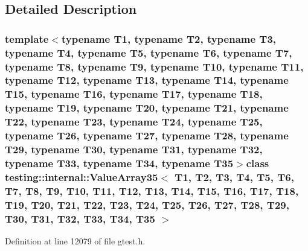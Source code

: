 \subsection{\-Detailed \-Description}
\subsubsection*{template$<$typename T1, typename T2, typename T3, typename T4, typename T5, typename T6, typename T7, typename T8, typename T9, typename T10, typename T11, typename T12, typename T13, typename T14, typename T15, typename T16, typename T17, typename T18, typename T19, typename T20, typename T21, typename T22, typename T23, typename T24, typename T25, typename T26, typename T27, typename T28, typename T29, typename T30, typename T31, typename T32, typename T33, typename T34, typename T35$>$class testing\-::internal\-::\-Value\-Array35$<$ T1, T2, T3, T4, T5, T6, T7, T8, T9, T10, T11, T12, T13, T14, T15, T16, T17, T18, T19, T20, T21, T22, T23, T24, T25, T26, T27, T28, T29, T30, T31, T32, T33, T34, T35 $>$}



\-Definition at line 12079 of file gtest.\-h.



